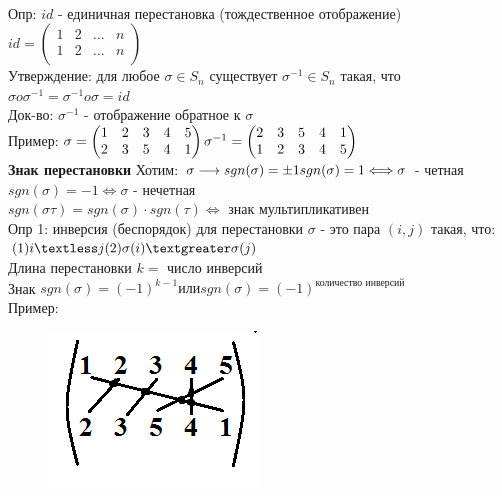 \documentclass[12pt, oneside]{book}
\theoremstyle{definition}
\begin{document}
\begin{enumerate}
\begin{figure}[h!]
\end{figure}\\
Опр: $id$ - единичная перестановка (тождественное отображение)\\
$id = \begin{pmatrix}
1 & 2 & ... & n\\
1 & 2 & ... & n\\
\end{pmatrix}$\\
Утверждение: для любое $\sigma \in S_n$ существует ${\sigma}^{-1} \in S_n$ такая, что $\sigma o {\sigma}^{-1} = {\sigma}^{-1} o \sigma = id$\\
Док-во: ${\sigma}^{-1}$ - отображение обратное к $\sigma$\\
Пример: $\sigma = \begin{pmatrix}
1 & 2 & 3 & 4 & 5\\
2 & 3 & 5 & 4 & 1\\
\end{pmatrix}\\
{\sigma}^{-1} = \begin{pmatrix}
2 & 3 & 5 & 4 & 1\\
1 & 2 & 3 & 4 & 5\\
\end{pmatrix}$\\
\textbf{Знак перестановки}
Хотим: $\sigma \longrightarrow sgn(\sigma) = \pm 1\\
sgn(\sigma) = 1 \Longleftrightarrow \sigma$ - четная \\
$sgn(\sigma) = -1 \Longleftrightarrow \sigma$ - нечетная \\
$sgn(\sigma \tau) = sgn(\sigma)  \cdot sgn(\tau) \Longleftrightarrow$ знак мультипликативен \\
Опр 1: инверсия (беспорядок) для перестановки $\sigma$ - это пара $(i,j)$ такая, что:\\
$(1) i \textless j \\
(2) \sigma (i) \textgreater \sigma (j)$\\
Длина перестановки $k =$ число инверсий \\
Знак $sgn(\sigma) = (-1)^{k-1} или sgn(\sigma) = (-1)^{\text{количество инверсий}}$\\
Пример: \begin{figure}[h!]
\centering
\includegraphics[scale=0.6]{4-2.PNG}

\end{figure}
\end{enumerate}
\end{document}

